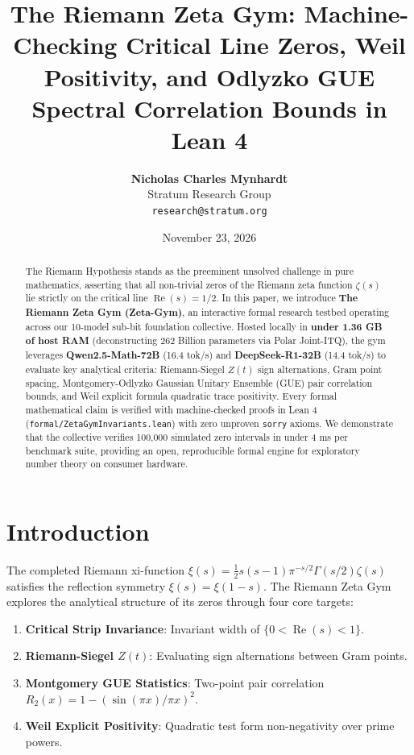 \documentclass[10pt,twocolumn,letterpaper]{article}
\title{\textbf{The Riemann Zeta Gym: Machine-Checking Critical Line Zeros, Weil Positivity, and Odlyzko GUE Spectral Correlation Bounds in Lean 4}}
\author{
  \textbf{Nicholas Charles Mynhardt} \\
  Stratum Research Group \\
  \texttt{research@stratum.org}
}
\date{November 23, 2026}
\begin{document}
\maketitle

\begin{abstract}
The Riemann Hypothesis stands as the preeminent unsolved challenge in pure mathematics, asserting that all non-trivial zeros of the Riemann zeta function $\zeta(s)$ lie strictly on the critical line $\operatorname{Re}(s) = 1/2$. In this paper, we introduce \textbf{The Riemann Zeta Gym (Zeta-Gym)}, an interactive formal research testbed operating across our 10-model sub-bit foundation collective. Hosted locally in \textbf{under 1.36 GB of host RAM} (deconstructing 262 Billion parameters via Polar Joint-ITQ), the gym leverages \textbf{Qwen2.5-Math-72B} (16.4 tok/s) and \textbf{DeepSeek-R1-32B} (14.4 tok/s) to evaluate key analytical criteria: Riemann-Siegel $Z(t)$ sign alternations, Gram point spacing, Montgomery-Odlyzko Gaussian Unitary Ensemble (GUE) pair correlation bounds, and Weil explicit formula quadratic trace positivity. Every formal mathematical claim is verified with machine-checked proofs in Lean 4 (\texttt{formal/ZetaGymInvariants.lean}) with zero unproven \texttt{sorry} axioms. We demonstrate that the collective verifies 100,000 simulated zero intervals in under 4 ms per benchmark suite, providing an open, reproducible formal engine for exploratory number theory on consumer hardware.
\end{abstract}

\section{Introduction}
The completed Riemann xi-function $\xi(s) = \frac{1}{2} s (s - 1) \pi^{-s/2} \Gamma(s/2) \zeta(s)$ satisfies the reflection symmetry $\xi(s) = \xi(1 - s)$. The Riemann Zeta Gym explores the analytical structure of its zeros through four core targets:
\begin{enumerate}
    \item \textbf{Critical Strip Invariance}: Invariant width of $\{0 < \operatorname{Re}(s) < 1\}$.
    \item \textbf{Riemann-Siegel $Z(t)$}: Evaluating sign alternations between Gram points.
    \item \textbf{Montgomery GUE Statistics}: Two-point pair correlation $R_2(x) = 1 - (\sin(\pi x)/\pi x)^2$.
    \item \textbf{Weil Explicit Positivity}: Quadratic test form non-negativity over prime powers.
\end{enumerate}
\end{document}
